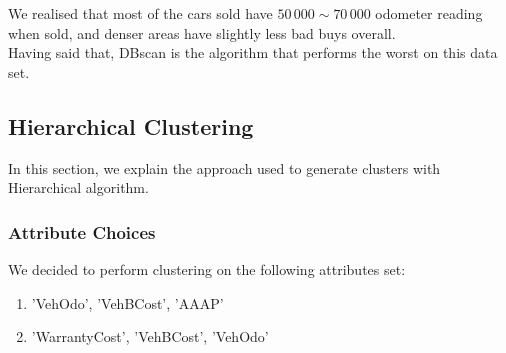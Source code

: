 \documentclass{article}
\begin{document}
	We realised that most of the cars sold have $50\,000 \sim 70\,000$ odometer reading when sold, and denser areas have slightly less bad buys overall. \\
	Having said that, DBscan is the algorithm that performs the worst on this data set.
	
	\subsection{Hierarchical Clustering}
	In this section, we explain the approach used to generate clusters with Hierarchical algorithm.
	\subsubsection{Attribute Choices}
	We decided to perform clustering on the following attributes set:
	\begin{enumerate}
		\item 'VehOdo', 'VehBCost', 'AAAP'
		\item 'WarrantyCost', 'VehBCost', 'VehOdo'
	\end{enumerate}
	
\end{document}
